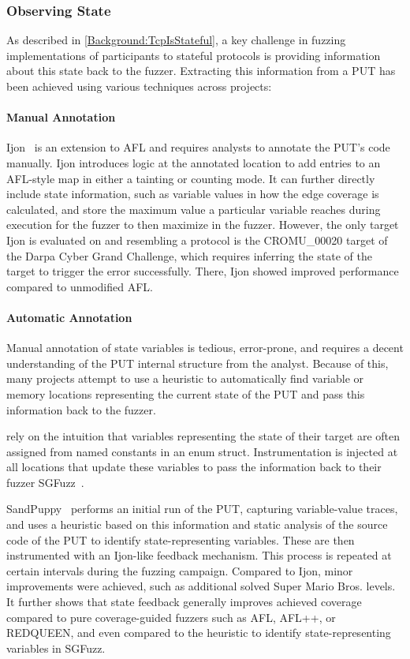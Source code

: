 \documentclass[twocolumn]{article}
\let\savedCite=\cite
\renewcommand{\cite}{\unskip~\savedCite}
\begin{document}
\subsubsection{Observing State}
\label{RelatedWorks:ProtocolFuzzing:ObservingState}

As described in \cref{Background:TcpIsStateful}, a key challenge in fuzzing implementations of participants to stateful protocols is providing information about this state back to the fuzzer. Extracting this information from a PUT has been achieved using various techniques across projects:

\paragraph{Manual Annotation}

Ijon\cite{Ijon} is an extension to AFL and requires analysts to annotate the PUT's code manually. Ijon introduces logic at the annotated location to add entries to an AFL-style map in either a tainting or counting mode. It can further directly include state information, such as variable values in how the edge coverage is calculated, and store the maximum value a particular variable reaches during execution for the fuzzer to then maximize in the fuzzer. However, the only target Ijon is evaluated on and resembling a protocol is the CROMU\_00020 target of the Darpa Cyber Grand Challenge, which requires inferring the state of the target to trigger the error successfully. There, Ijon showed improved performance compared to unmodified AFL.

\paragraph{Automatic Annotation}

Manual annotation of state variables is tedious, error-prone, and requires a decent understanding of the PUT internal structure from the analyst. Because of this, many projects attempt to use a heuristic to automatically find variable or memory locations representing the current state of the PUT and pass this information back to the fuzzer.

\citeauthor{SGFuzz} rely on the intuition that variables representing the state of their target are often assigned from named constants in an enum struct. Instrumentation is injected at all locations that update these variables to pass the information back to their fuzzer SGFuzz\cite{SGFuzz}.

SandPuppy\cite{SandPuppy} performs an initial run of the PUT, capturing variable-value traces, and uses a heuristic based on this information and static analysis of the source code of the PUT to identify state-representing variables. These are then instrumented with an Ijon-like feedback mechanism. This process is repeated at certain intervals during the fuzzing campaign. Compared to Ijon, minor improvements were achieved, such as additional solved Super Mario Bros. levels. It further shows that state feedback generally improves achieved coverage compared to pure coverage-guided fuzzers such as AFL, AFL++, or REDQUEEN, and even compared to the heuristic to identify state-representing variables in SGFuzz.
\end{document}
